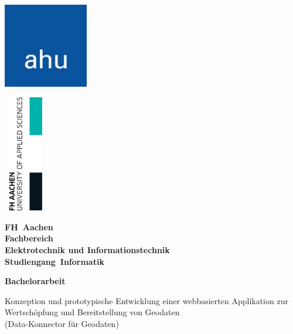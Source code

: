 \documentclass[a4paper,12pt]{scrreprt}
\begin{document}
	\begin{titlepage}
		\thispagestyle{empty}
		
		\noindent
		\begin{minipage}[t]{0.5\textwidth}
			\includegraphics[width=3.7cm]{firmenlogo.jpg}
		\end{minipage}%
		\begin{minipage}[t]{0.5\textwidth}
			\raggedleft
			\includegraphics[width=1.7cm]{FHAC.jpg}
		\end{minipage}
		
		\vspace{1.0cm}
		
		{\centering \bfseries \Large FH~Aachen \\
			\vspace{1cm}
			\normalsize Fachbereich\\
			Elektrotechnik und Informationstechnik \\
			Studiengang~Informatik \par}
		
		\vspace{1cm}
		
		{\centering \bfseries \large Bachelorarbeit \par}
		
		\vspace{1cm}
		
		\centering \begin{minipage}[t]{13cm}
			\centering \small Konzeption und prototypische Entwicklung einer webbasierten Applikation zur Wertschöpfung und Bereitstellung von Geodaten \\
			(Data-Konnector für Geodaten)
			\medskip
		\end{minipage}
		

\end{titlepage}
\end{document}
